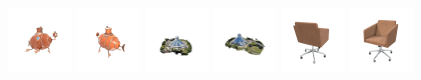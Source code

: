 \begin{figure}[htbp]
  \includegraphics[width=0.15\textwidth]{images/data/samples/13.1.jpeg}\hspace{0.01\textwidth}%
  \includegraphics[width=0.15\textwidth]{images/data/samples/13.2.jpeg}\hfill
  \includegraphics[width=0.15\textwidth]{images/data/samples/14.1.jpeg}\hspace{0.01\textwidth}%
  \includegraphics[width=0.15\textwidth]{images/data/samples/14.2.jpeg}\hfill
  \includegraphics[width=0.15\textwidth]{images/data/samples/15.1.jpeg}\hspace{0.01\textwidth}%
  \includegraphics[width=0.15\textwidth]{images/data/samples/15.2.jpeg}\\
  \vspace{2mm}


\end{figure}
